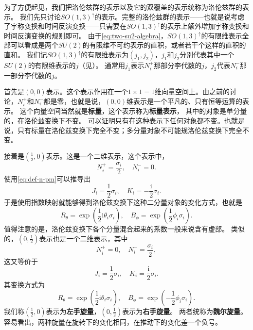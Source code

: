 \documentclass[hyperref, UTF8, a4paper]{ctexart}
\newcommand*{\ii}{\mathrm{i}}
\renewcommand{\autoref}{\prettyref}
\begin{document}
为了方便起见，我们把洛伦兹群的表示以及它的双覆盖的表示统称为洛伦兹群的表示。
我们先只讨论$SO(1,3)^\uparrow$的表示。完整的洛伦兹群的表示——也就是说考虑了宇称变换和时间反演变换——只需要在$SO(1,3)^\uparrow$的表示上额外增加宇称变换和时间反演变换的规则即可。
由于\eqref{eq:two-su2-algebra}，$SO(1,3)^\uparrow$的有限维表示全部可以看成是两个$SU(2)$的有限维不可约表示的直积，或者若干个这样的直积的直和。
我们记$SO(1,3)^\uparrow$的有限维表示为$(j_1, j_2)$，$j_1$和$j_2$分别代表其中一个$SU(2)$的有限维表示的$j$（见\autoref{sec:rotation}）。
通常用$j_1$表示$N^+_i$那部分李代数的$j$，$j_2$代表$N^-_i$那一部分李代数的$j$。

首先是$(0,0)$表示。这个表示作用在一个$1\times1 = 1$维向量空间上。由之前的讨论，$N^+_i$和$N^-_i$都是零，也就是说，$(0,0)$维表示是一个平凡的、只有恒等运算的表示。
这个向量空间当然就是\textbf{标量}，这个表示称为\textbf{标量表示}，
其中的对象是单分量的，在洛伦兹变换下不变。
可以证明只有在这种表示下任何对象都不变。也就是说，只有标量在洛伦兹变换下完全不变；多分量对象不可能规洛伦兹变换下完全不变。

接着是$(\frac{1}{2}, 0)$表示。这是一个二维表示，这个表示中，
\begin{equation}
    N^+_i = \frac{\sigma_i}{2}, \quad N^-_i = 0.
\end{equation}
使用\eqref{eq:def-n-pm}可以推导出
\begin{equation}
    J_i = \frac{1}{2} \sigma_i, \quad K_i = - \frac{\ii}{2} \sigma_i.
\end{equation}
于是使用指数映射就能够得到洛伦兹变换下这种二分量对象的变化方式，也就是
\begin{equation}
    R_\theta = \exp \left( \frac{1}{2} \ii \theta_i \sigma_i \right), \quad B_\phi = \exp \left( \frac{1}{2} \phi_i \sigma_i \right).
\end{equation}
值得注意的是，洛伦兹变换下各个分量混合起来的系数一般来说含有虚部。
类似的，$(0, \frac{1}{2})$表示也是一个二维表示，其中
\begin{equation}
    N^+_i = 0, \quad N^-_i = \frac{\sigma_i}{2},
\end{equation}
这又等价于
\begin{equation}
    J_i = \frac{1}{2} \sigma_i, \quad K_i = \frac{\ii}{2} \sigma_i.
\end{equation}
其变换方式为
\begin{equation}
    R_\theta = \exp \left( \frac{1}{2} \ii \theta_i \sigma_i \right), \quad B_\phi = \exp \left( - \frac{1}{2} \phi_i \sigma_i \right).
\end{equation}
我们称$(\frac{1}{2}, 0)$表示为\textbf{左手旋量}，$(0, \frac{1}{2})$表示为\textbf{右手旋量}。
两者统称为\textbf{魏尔旋量}。容易看出，两种旋量在旋转下的变化相同，在推动下的变化差一个负号。
\end{document}
